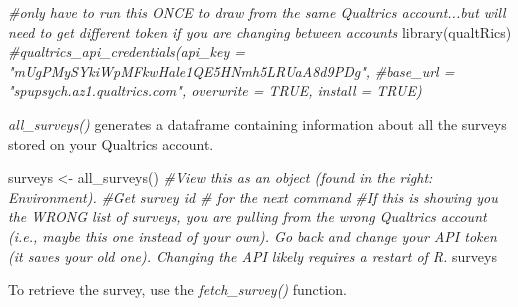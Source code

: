 \documentclass[
  english,
]{book}
\newenvironment{Shaded}{\begin{snugshade}}{\end{snugshade}}
\newcommand{\CommentTok}[1]{\textcolor[rgb]{0.56,0.35,0.01}{\textit{#1}}}
\newcommand{\FunctionTok}[1]{\textcolor[rgb]{0.00,0.00,0.00}{#1}}
\newcommand{\NormalTok}[1]{#1}
\newcommand{\OtherTok}[1]{\textcolor[rgb]{0.56,0.35,0.01}{#1}}
\begin{document}
\begin{Shaded}
\begin{Highlighting}[]
\CommentTok{\#only have to run this ONCE to draw from the same Qualtrics account...but will need to get different token if you are changing between accounts }
\FunctionTok{library}\NormalTok{(qualtRics)}
\CommentTok{\#qualtrics\_api\_credentials(api\_key = "mUgPMySYkiWpMFkwHale1QE5HNmh5LRUaA8d9PDg",}
              \CommentTok{\#base\_url = "spupsych.az1.qualtrics.com", overwrite = TRUE, install = TRUE)}
\end{Highlighting}
\end{Shaded}

\emph{all\_surveys()} generates a dataframe containing information about all the surveys stored on your Qualtrics account.

\begin{Shaded}
\begin{Highlighting}[]
\NormalTok{surveys }\OtherTok{\textless{}{-}} \FunctionTok{all\_surveys}\NormalTok{() }
\CommentTok{\#View this as an object (found in the right: Environment).  }
\CommentTok{\#Get survey id \# for the next command}
\CommentTok{\#If this is showing you the WRONG list of surveys, you are pulling from the wrong Qualtrics account (i.e., maybe this one instead of your own). Go back and change your API token (it saves your old one). Changing the API likely requires a restart of R.}
\NormalTok{surveys}
\end{Highlighting}
\end{Shaded}

To retrieve the survey, use the \emph{fetch\_survey()} function.
\end{document}
